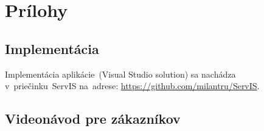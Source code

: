\documentclass[12pt,a4paper,twoside,openright]{report}
\begin{document}



\tableofcontents














\appendix
\chapter{Prílohy}

\section{Implementácia}
\label{implementacia}

Implementácia aplikácie~(Visual Studio solution) sa nachádza\\v~priečinku~ServIS na~adrese: \url{https://github.com/milantru/ServIS}.

\section{Videonávod pre zákazníkov}
\label{videonavod pre zakaznikov}
\end{document}
